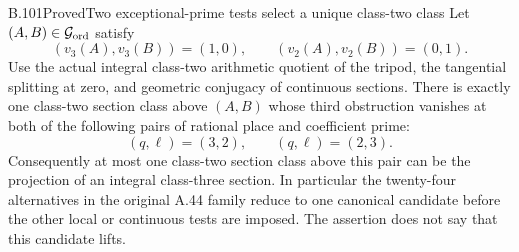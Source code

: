 \begin{result}{B.101}{Proved}{Two exceptional-prime tests select a unique class-two class}
Let $(A,B)\in\mathcal G_{\rm ord}$ satisfy
\[
(v_3(A),v_3(B))=(1,0),\qquad
(v_2(A),v_2(B))=(0,1).
\]
Use the actual integral class-two arithmetic quotient of the tripod,
the tangential splitting at zero, and geometric conjugacy of continuous
sections. There is exactly one class-two section class above $(A,B)$
whose third obstruction vanishes at both of the following pairs of
rational place and coefficient prime:
\[
(q,\ell)=(3,2),\qquad(q,\ell)=(2,3).
\]
Consequently at most one class-two section class above this pair can
be the projection of an integral class-three section. In particular
the twenty-four alternatives in the original A.44 family reduce to
one canonical candidate before the other local or continuous tests
are imposed. The assertion does not say that this candidate lifts.
\end{result}
